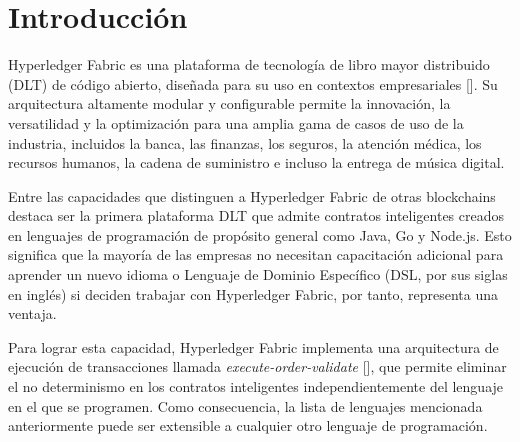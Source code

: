 \chapter*{Introducción}\label{chapter:introduction}

Hyperledger Fabric es una plataforma de tecnología de libro mayor distribuido (DLT) de código abierto, diseñada para su uso en contextos empresariales [\cite{hlf-doc}]. Su arquitectura altamente modular y configurable permite la innovación, la versatilidad y la optimización para una amplia gama de casos de uso de la industria, incluidos la banca, las finanzas, los seguros, la atención médica, los recursos humanos, la cadena de suministro e incluso la entrega de música digital.

Entre las capacidades que distinguen a Hyperledger Fabric de otras blockchains destaca ser la primera plataforma DLT que admite contratos inteligentes creados en lenguajes de programación de propósito general como Java, Go y Node.js.
Esto significa que la mayoría de las empresas no necesitan capacitación adicional para aprender un nuevo idioma o Lenguaje de Dominio Específico (DSL, por sus siglas en inglés) si deciden trabajar con Hyperledger Fabric, por tanto, representa una ventaja.

Para lograr esta capacidad, Hyperledger Fabric implementa una arquitectura de ejecución de transacciones llamada \textit{execute-order-validate} [\cite{hlf-paper}], que permite eliminar el no determinismo en los contratos inteligentes independientemente del lenguaje en el que se programen. Como consecuencia, la lista de lenguajes mencionada anteriormente puede ser extensible a cualquier otro lenguaje de programación. 




